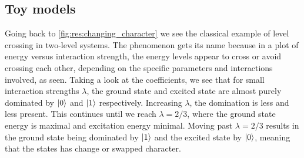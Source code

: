 \subsection{Toy models}
Going back to \cref{fig:res:changing_character} we see the classical example of level crossing in two-level systems. The phenomenon gets its name because in a plot of energy versus interaction strength, the energy levels appear to cross or avoid crossing each other, depending on the specific parameters and interactions involved, as seen. Taking a look at the coefficients, we see that for small interaction strengths $\lambda$, the ground state and excited state are almost purely dominated by $\ket{0}$ and $\ket{1}$ respectively. Increasing $\lambda$, the domination is less and less present. This continues until we reach $\lambda = 2/3$, where the ground state energy is maximal and excitation energy minimal. Moving past  $\lambda = 2/3$ results in the ground state being dominated by $\ket{1}$ and the excited state by $\ket{0}$, meaning that the states has change or swapped character.

